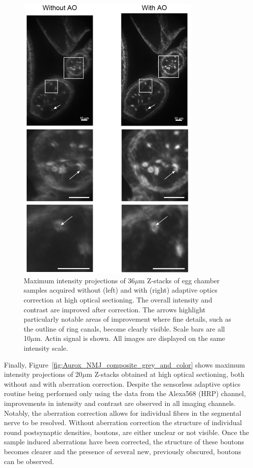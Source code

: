 \begin{figure}[h]
	\centering
	\includegraphics[width=0.8\textwidth]{images/Aurox_egg_chambers_composite.jpg}
	\caption[\textit{Drosophila} egg chamber data acquired on the Aurox imaging 
		system]{Maximum intensity projections of 36$\mu$m Z-stacks of egg 
		chamber samples acquired without (left) and with (right) adaptive 
		optics correction at high optical sectioning. The overall intensity 
		and contrast are improved after correction. The arrows highlight 
		particularly notable areas of improvement where fine details, such 
		as the outline of ring canals, become clearly visible. Scale bars 
		are all 10$\mu$m. Actin signal is shown. All images are displayed 
		on the same intensity scale.}
	\label{fig:Aurox_egg_chambers_composite}
\end{figure}

Finally, Figure~\ref{fig:Aurox_NMJ_composite_grey_and_color} shows maximum 
intensity projections of 20$\mu$m Z-stacks obtained at high optical 
sectioning, both without and with aberration correction. Despite the 
sensorless adaptive optics routine being performed only using the data 
from the Alexa568 (HRP) channel, improvements in intensity and contrast
are observed in all imaging channels. Notably, the aberration correction 
allows for individual fibres in the segmental nerve to be resolved. Without
aberration correction the structure of individual round postsynaptic 
densities, boutons, are either unclear or not visible. Once the sample 
induced aberrations have been corrected, the structure of these boutons 
becomes clearer and the presence of several new, previously obscured, boutons 
can be observed.

